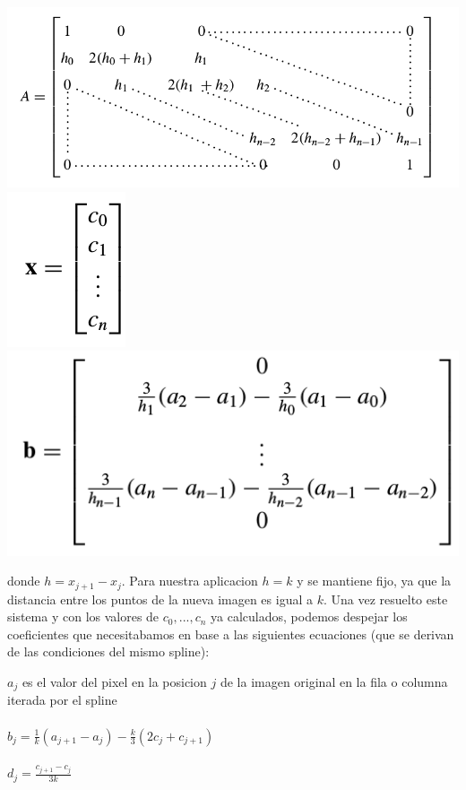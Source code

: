 \begin{center}
\includegraphics[scale=0.50]{imagenes/A.png}
\includegraphics[scale=0.50]{imagenes/x.png}
\includegraphics[scale=0.50]{imagenes/b.png}
\end{center}

donde $h = x_{j+1} - x_{j}$. Para nuestra aplicacion $h = k$ y se mantiene fijo, ya que la distancia entre los puntos de la nueva imagen es igual a $k$. Una vez resuelto este sistema y con los valores de $c_{0},..., c_{n}$ ya calculados, podemos despejar los coeficientes que necesitabamos en base a las siguientes ecuaciones (que se derivan de las condiciones del mismo spline):

$a_j$ es el valor del pixel en la posicion $j$ de la imagen original en la fila o columna iterada por el spline \\ \\
$b_{j} = \frac{1}{k}(a_{j+1} - a_j) - \frac{k}{3}(2c_j + c_{j+1})$ \\ \\
$d_{j} = \frac{c_{j+1} - c_{j}}{3k} $ \\

